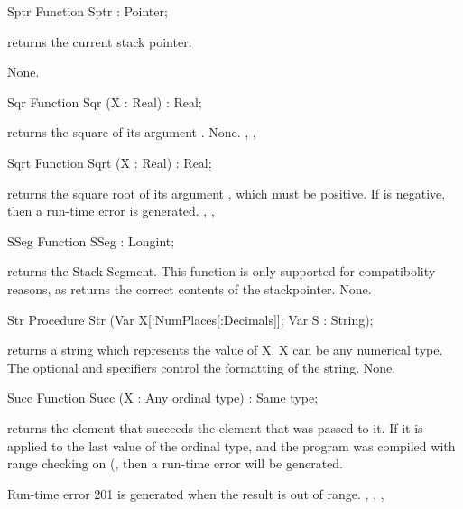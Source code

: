 \documentclass{report}
\begin{document}
\begin{function}{Sptr}
\Declaration
Function Sptr  : Pointer;

\Description
{} returns the current stack pointer.

\Errors
None.
\SeeAlso

\end{function}
\html{}
\begin{function}{Sqr}
\Declaration
Function Sqr (X : Real) : Real;

\Description
{} returns the square of its argument .
\Errors
None.
\SeeAlso
{}, , 
\end{function}
\html{}
\begin{function}{Sqrt}
\Declaration
Function Sqrt (X : Real) : Real;

\Description
{} returns the square root of its argument , which must be
positive.
\Errors
If  is negative, then a run-time error is generated.
\SeeAlso
{}, , 
\end{function}
\html{}
\begin{function}{SSeg}
\Declaration
Function SSeg  : Longint;

\Description
  returns the Stack Segment. This function is only 
 supported for compatibolity reasons, as  returns the
correct contents of the stackpointer.
\Errors
None.
\SeeAlso
{}
\end{function}
\html{}
\begin{procedure}{Str}
\Declaration
Procedure Str (Var X[:NumPlaces[:Decimals]]; Var S : String);

\Description
{} returns a string which represents the value of X. X can be any
numerical type.
The optional  and  specifiers control the
formatting of the string.
\Errors
None.
\SeeAlso
{}
\end{procedure}
\html{}
\begin{function}{Succ}
\Declaration
Function Succ (X : Any ordinal type) : Same type;

\Description
  returns the element that succeeds the element that was passed
to it. If it is applied to the last value of the ordinal type, and the
program was compiled with range checking on (, then a run-time
error will be generated.

\Errors
Run-time error 201 is generated when the result is out of
range.
\SeeAlso
{}, , , 
\end{function}
\end{document}
